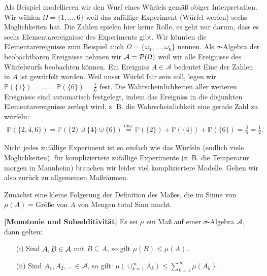\begin{disc}
	Als Beispiel modellieren wir den Wurf eines W\"urfels gem\"a\ss{} obiger Interpretation. Wir w\"ahlen $\Omega = \{1,...,6\}$ weil das zuf\"allige Experiment (W\"urfel werfen) sechs M\"oglichkeiten hat. Die Zahlen spielen hier keine Rolle, es geht nur darum, dass es sechs Elementarereignisse des Experiments gibt. Wir k\"onnten die Elementarereignisse zum Beispiel auch $\Omega=\{\omega_1,...,\omega_6\}$ nennen. Als $\sigma$-Algebra der beobachtbaren Ereignisse nehmen wir $\mathcal{A}=\mathcal P(\Omega)$ weil wir alle Ereignisse des W\"urfelwurfs beobachten k\"onnen. Ein Ereigniss $A\in \mathcal A$ bedeutet \glqq Eine der Zahlen in $A$ ist gew\"urfelt worden\grqq.  Weil unser W\"urfel fair sein soll, legen wir $\mathbb P(\{1\})=...=\mathbb P(\{6\})= \frac{1}{6}$ fest. Die Wahrscheinlichkeiten aller weiteren Ereignisse sind automatisch festgelegt, indem das Ereigniss in die disjunkten Elementarereignisse zerlegt wird, z. B. die Wahrscheinlichkeit eine gerade Zahl zu w\"urfeln:
	\begin{align*}	
		\mathbb P(\{2, 4,6\}) =\mathbb P(\{2\}\cupdot \{4\} \cupdot \{6\})\overset{\text{disj.}}{=} \mathbb P(\{2\})+\mathbb P(\{4\})+\mathbb P(\{6\}) =\frac{3}{6}= \frac{1}{2}.
	\end{align*}
	\end{disc}
Nicht jedes zuf\"allige Experiment ist so einfach wie das W\"urfeln (endlich viele M\"oglichkeiten), f\"ur kompliziertere zuf\"allige Experimente (z. B. die Temperatur morgen in Mannheim) brauchen wir leider viel kompliziertere Modelle. Gehen wir also zur\"uck zu allgemeinen Ma\ss r\"aumen.\smallskip

Zun\"achst eine kleine Folgerung der Definition des Ma\ss es, die im Sinne von \glqq $\mu(A)=$Gr\"o\ss e von $A$\grqq{} von Mengen total Sinn macht.
\begin{lemma} \label{monsub}  \textbf{[Monotonie und Subadditivit\"at]}
Es sei $\mu$ ein Ma\ss{} auf einer  $\sigma$-Algebra $\mathcal A$, dann gelten:
\begin{itemize}
\item[(i)] Sind $A, B \in \mathcal{A}$ mit $B \subseteq A$, so gilt $\mu(B) \leq \mu(A).$
\item[(ii)] Sind $A_1,A_2,... \in \mathcal A$, so gilt: $\mu(\cup_{k=1}^\infty A_k)\leq \sum_{k=1}^\infty \mu(A_k)$.
\end{itemize}
\end{lemma}


